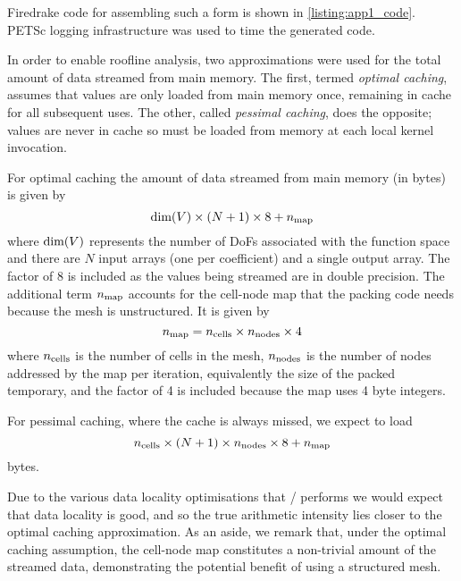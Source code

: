 \documentclass[thesis]{subfiles}
\begin{document}
Firedrake code for assembling such a form is shown in \cref{listing:app1_code}.
PETSc logging infrastructure was used to time the generated code.

In order to enable roofline analysis, two approximations were used for the total amount of data streamed from main memory.
The first, termed \emph{optimal caching}, assumes that values are only loaded from main memory once, remaining in cache for all subsequent uses.
The other, called \emph{pessimal caching}, does the opposite; values are never in cache so must be loaded from memory at each local kernel invocation.

For optimal caching the amount of data streamed from main memory (in bytes) is given by
\begin{equation*}
  \textnormal{dim}(V) \times (N + 1) \times 8 + n_{\textnormal{map}}
\end{equation*}
where $\textnormal{dim}(V)$ represents the number of DoFs associated with the function space and there are $N$ input arrays (one per coefficient) and a single output array.
The factor of 8 is included as the values being streamed are in double precision.
The additional term $n_{\textnormal{map}}$ accounts for the cell-node map that the packing code needs because the mesh is unstructured.
It is given by
\begin{equation*}
  n_{\textnormal{map}} = n_{\textnormal{cells}} \times n_{\textnormal{nodes}} \times 4
\end{equation*}
where $n_{\textnormal{cells}}$ is the number of cells in the mesh, $n_{\textnormal{nodes}}$ is the number of nodes addressed by the map per iteration, equivalently the size of the packed temporary, and the factor of 4 is included because the map uses 4 byte integers.

For pessimal caching, where the cache is always missed, we expect to load
\begin{equation*}
  n_{\textnormal{cells}} \times (N + 1) \times n_{\textnormal{nodes}} \times 8 + n_{\textnormal{map}}
\end{equation*}
bytes.

Due to the various data locality optimisations that / performs we would expect that data locality is good, and so the true arithmetic intensity lies closer to the optimal caching approximation.
As an aside, we remark that, under the optimal caching assumption, the cell-node map constitutes a non-trivial amount of the streamed data, demonstrating the potential benefit of using a structured mesh.
\end{document}
